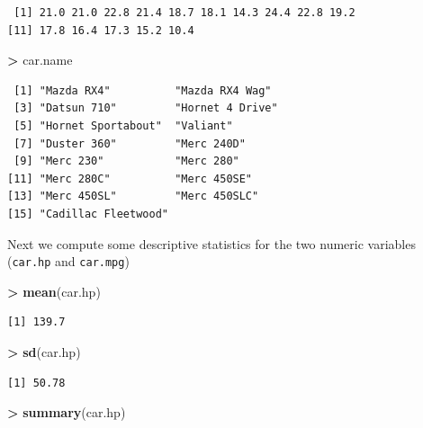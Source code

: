 \documentclass[
]{krantz}
\makeatletter
\newenvironment{Shaded}{\begin{snugshade}}{\end{snugshade}}
\newcommand{\KeywordTok}[1]{\textcolor[rgb]{0.27,0.27,0.27}{\textbf{#1}}}
\newcommand{\NormalTok}[1]{#1}
\newcommand{\OperatorTok}[1]{\textcolor[rgb]{0.43,0.43,0.43}{\textbf{#1}}}
\newcommand{\StringTok}[1]{\textcolor[rgb]{0.5,0.5,0.5}{#1}}
\newenvironment{kframe}{%
\medskip{}
\setlength{\fboxsep}{.8em}
 \def\at@end@of@kframe{}%
 \ifinner\ifhmode%
  \def\at@end@of@kframe{\end{minipage}}%
  \begin{minipage}{\columnwidth}%
 \fi\fi%
 \def\FrameCommand##1{\hskip\@totalleftmargin \hskip-\fboxsep
 \colorbox{shadecolor}{##1}\hskip-\fboxsep
     \hskip-\linewidth \hskip-\@totalleftmargin \hskip\columnwidth}%
 \MakeFramed {\advance\hsize-\width
   \@totalleftmargin\z@ \linewidth\hsize
   \@setminipage}}%
 {\par\unskip\endMakeFramed%
 \at@end@of@kframe}
\renewenvironment{Shaded}{\begin{kframe}}{\end{kframe}}
\makeatother
\begin{document}
\begin{verbatim}
 [1] 21.0 21.0 22.8 21.4 18.7 18.1 14.3 24.4 22.8 19.2
[11] 17.8 16.4 17.3 15.2 10.4
\end{verbatim}

\begin{Shaded}
\begin{Highlighting}[]
\OperatorTok{\textgreater{}}\StringTok{ }\NormalTok{car.name}
\end{Highlighting}
\end{Shaded}

\begin{verbatim}
 [1] "Mazda RX4"          "Mazda RX4 Wag"     
 [3] "Datsun 710"         "Hornet 4 Drive"    
 [5] "Hornet Sportabout"  "Valiant"           
 [7] "Duster 360"         "Merc 240D"         
 [9] "Merc 230"           "Merc 280"          
[11] "Merc 280C"          "Merc 450SE"        
[13] "Merc 450SL"         "Merc 450SLC"       
[15] "Cadillac Fleetwood"
\end{verbatim}

Next we compute some descriptive statistics for the two numeric variables (\texttt{car.hp} and \texttt{car.mpg})

\begin{Shaded}
\begin{Highlighting}[]
\OperatorTok{\textgreater{}}\StringTok{ }\KeywordTok{mean}\NormalTok{(car.hp)}
\end{Highlighting}
\end{Shaded}

\begin{verbatim}
[1] 139.7
\end{verbatim}

\begin{Shaded}
\begin{Highlighting}[]
\OperatorTok{\textgreater{}}\StringTok{ }\KeywordTok{sd}\NormalTok{(car.hp)}
\end{Highlighting}
\end{Shaded}

\begin{verbatim}
[1] 50.78
\end{verbatim}

\begin{Shaded}
\begin{Highlighting}[]
\OperatorTok{\textgreater{}}\StringTok{ }\KeywordTok{summary}\NormalTok{(car.hp)}
\end{Highlighting}
\end{Shaded}
\end{document}
